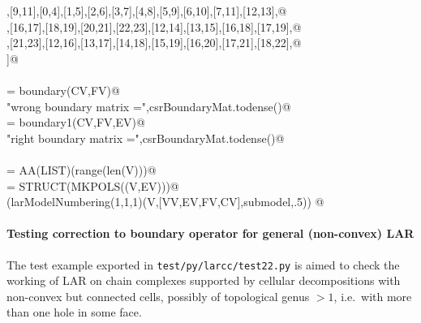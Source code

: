 \documentclass[11pt,oneside]{article}	%
\begin{document}
\begin{flushleft}
\begin{list}{}{}
\mbox{}\verb@[8,10],[9,11],[0,4],[1,5],[2,6],[3,7],[4,8],[5,9],[6,10],[7,11],[12,13],@\\
\mbox{}\verb@[14,15],[16,17],[18,19],[20,21],[22,23],[12,14],[13,15],[16,18],[17,19],@\\
\mbox{}\verb@[20,22],[21,23],[12,16],[13,17],[14,18],[15,19],[16,20],[17,21],[18,22],@\\
\mbox{}\verb@[19,23]]@\\
\mbox{}\verb@@\\
\mbox{}\verb@csrBoundaryMat = boundary(CV,FV)@\\
\mbox{}\verb@print "wrong boundary matrix =",csrBoundaryMat.todense()@\\
\mbox{}\verb@csrBoundaryMat = boundary1(CV,FV,EV)@\\
\mbox{}\verb@print "right boundary matrix =",csrBoundaryMat.todense()@\\
\mbox{}\verb@@\\
\mbox{}\verb@VV = AA(LIST)(range(len(V)))@\\
\mbox{}\verb@submodel = STRUCT(MKPOLS((V,EV)))@\\
\mbox{}\verb@VIEW(larModelNumbering(1,1,1)(V,[VV,EV,FV,CV],submodel,.5)) @\\
\mbox{}\verb@@{\NWsep}
\end{list}
\vspace{-2ex}
\end{flushleft}

\paragraph{Testing correction to boundary operator for general (non-convex) LAR}

The test example exported in \texttt{test/py/larcc/test22.py} is aimed to check the working of LAR on chain complexes supported by cellular decompositions with non-convex but connected cells, possibly of topological genus $>1$, i.e.~with more than one hole in some face.
\end{document}
